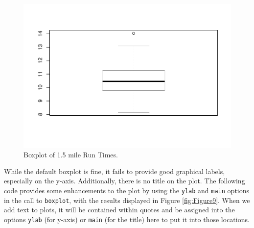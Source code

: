 \documentclass[]{book}
\newenvironment{Shaded}{\begin{snugshade}}{\end{snugshade}}
\newcommand{\KeywordTok}[1]{\textcolor[rgb]{0.13,0.29,0.53}{\textbf{{#1}}}}
\newcommand{\DataTypeTok}[1]{\textcolor[rgb]{0.13,0.29,0.53}{{#1}}}
\newcommand{\StringTok}[1]{\textcolor[rgb]{0.31,0.60,0.02}{{#1}}}
\newcommand{\NormalTok}[1]{{#1}}
\begin{document}
\begin{Shaded}
\end{Shaded}

\begin{figure}[htbp]
\centering
\includegraphics{GreenwoodBanner_files/figure-latex/Figure8-1.pdf}
\caption{\label{fig:Figure8}Boxplot of 1.5 mile Run Times.}
\end{figure}

While the default boxplot is fine, it fails to provide good graphical
labels, especially on the y-axis. Additionally, there is no title on the
plot. The following code provides some enhancements to the plot by using
the \texttt{ylab} and \texttt{main} options in the call to
\texttt{boxplot}, with the results displayed in Figure
\ref{fig:Figure9}. When we add text to plots, it will be contained
within quotes and be assigned into the options \texttt{ylab} (for
y-axis) or \texttt{main} (for the title) here to put it into those
locations.



\begin{Shaded}
\end{Shaded}
\end{document}
